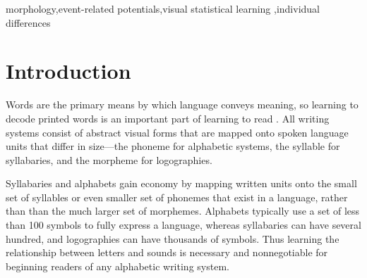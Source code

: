 \documentclass[review]{elsarticle}
\begin{document}
\begin{frontmatter}

\begin{keyword}
 morphology\sep event-related potentials\sep visual statistical learning \sep individual differences
\end{keyword}

\end{frontmatter}

\linenumbers

\section{Introduction}

Words are the primary means by which language conveys meaning, so learning to decode printed words is an important part of learning to read \citep[e.g.,][]{castles_ending_2018} .  All writing systems consist of abstract visual forms that are mapped onto spoken language units that differ in size—the phoneme for alphabetic systems, the syllable for syllabaries, and the morpheme for logographies. 

Syllabaries and alphabets gain economy by mapping written units onto the small set of syllables or even smaller set of phonemes  that exist in a language, rather than than the much larger set of morphemes. Alphabets typically use a set of less than 100 symbols to fully express a language, whereas syllabaries can have several hundred, and logographies can have thousands of symbols.
 Thus learning the relationship between letters and sounds is necessary and nonnegotiable for beginning readers of any alphabetic writing system.
\end{document}
